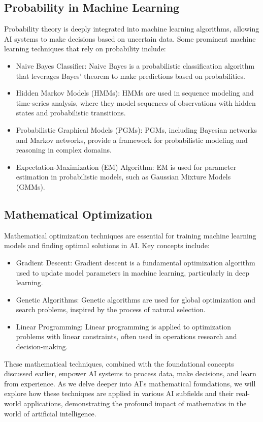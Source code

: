 \documentclass[conference]{IEEEtran}
\begin{document}
\subsection{Probability in Machine Learning}

Probability theory is deeply integrated into machine learning algorithms, allowing AI systems to make decisions based on uncertain data. Some prominent machine learning techniques that rely on probability include:
    \begin{itemize}
      \item Naive Bayes Classifier: Naive Bayes is a probabilistic classification algorithm that leverages Bayes' theorem to make predictions based on probabilities.

      \item Hidden Markov Models (HMMs): HMMs are used in sequence modeling and time-series analysis, where they model sequences of observations with hidden states and probabilistic transitions.

      \item Probabilistic Graphical Models (PGMs): PGMs, including Bayesian networks and Markov networks, provide a framework for probabilistic modeling and reasoning in complex domains.

      \item Expectation-Maximization (EM) Algorithm: EM is used for parameter estimation in probabilistic models, such as Gaussian Mixture Models (GMMs).
    \end{itemize}

\subsection{Mathematical Optimization}

Mathematical optimization techniques are essential for training machine learning models and finding optimal solutions in AI. Key concepts include:
    \begin{itemize}
      \item Gradient Descent: Gradient descent is a fundamental optimization algorithm used to update model parameters in machine learning, particularly in deep learning.

      \item Genetic Algorithms: Genetic algorithms are used for global optimization and search problems, inspired by the process of natural selection.

      \item Linear Programming: Linear programming is applied to optimization problems with linear constraints, often used in operations research and decision-making.
    \end{itemize}
These mathematical techniques, combined with the foundational concepts discussed earlier, empower AI systems to process data, make decisions, and learn from experience. As we delve deeper into AI's mathematical foundations, we will explore how these techniques are applied in various AI subfields and their real-world applications, demonstrating the profound impact of mathematics in the world of artificial intelligence.
\end{document}
